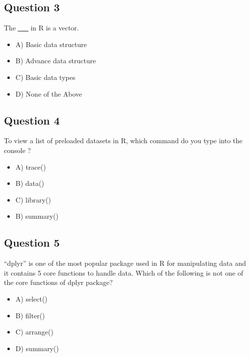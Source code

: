 \documentclass[11pt]{article}
\begin{document}
\subsection*{Question 3}
\label{sec:org50584af}
The \uline{\uline{\uline{\uline{\uline{\_\_}}}}} in R is a vector.

\begin{itemize}
\item A) Basic data structure

\item B) Advance data structure

\item C) Basic data types

\item D) None of the Above
\end{itemize}

\subsection*{Question 4}
\label{sec:org9c9848f}
To view a list of preloaded datasets in R, which command do you type into the console ?

\begin{itemize}
\item A) trace()

\item B) data()

\item C) library()

\item B) summary()
\end{itemize}

\subsection*{Question 5}
\label{sec:org17321d5}
“dplyr” is one of the most popular package used in R for manipulating data and
it contains 5 core functions to handle data. Which of the following is not one
of the core functions of dplyr package?

\begin{itemize}
\item A) select()

\item B) filter()

\item C) arrange()

\item D) summary()
\end{itemize}
\end{document}
